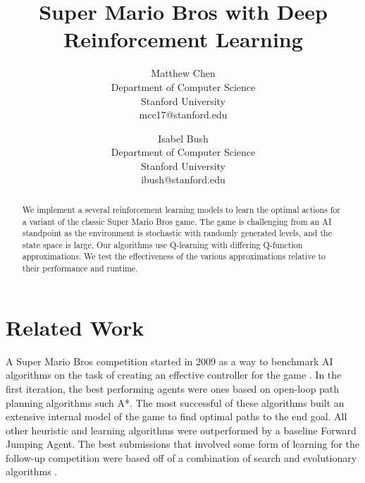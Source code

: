 \documentclass[12pt]{article}
\begin{document}
\nocite{*}

\title{Super Mario Bros with Deep Reinforcement Learning}

\author{
  Matthew Chen\\
  \small \vspace{-2mm} Department of Computer Science\\
  \small \vspace{-2mm} Stanford University\\
  \small mcc17@stanford.edu
  \and
  Isabel Bush\\
  \small \vspace{-2mm} Department of Computer Science\\
  \small \vspace{-2mm} Stanford University\\
  \small ibush@stanford.edu
}
\date{}
\maketitle

\begin{abstract}
We implement a several reinforcement learning models to learn the optimal actions for a variant of the classic Super Mario Bros game. The game is challenging from an AI standpoint as the environment is stochastic with randomly generated levels, and the state space is large. Our algorithms use Q-learning with differing Q-function approximations. We test the effectiveness of the various approximations relative to their performance and runtime.

\end{abstract}

\section{Related Work}

A Super Mario Bros competition started in 2009 as a way to benchmark AI algorithms on the task of creating an effective controller for the game \cite{togelius20102009}. In the first iteration, the best performing agents were ones based on open-loop path planning algorithms such A*. The most successful of these algorithms built an extensive internal model of the game to find optimal paths to the end goal. All other heuristic and learning algorithms were outperformed by a baseline Forward Jumping Agent. The best submissions that involved some form of learning for the follow-up competition were based off of a combination of search and evolutionary algorithms \cite{karakovskiy2012mario}.
\end{document}
